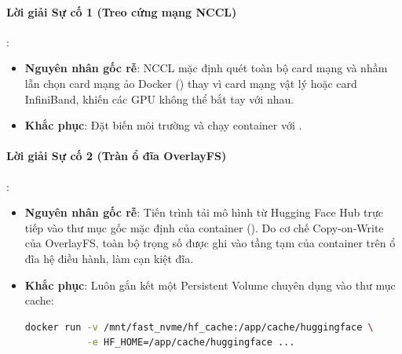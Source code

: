 \paragraph{Lời giải Sự cố 1 (Treo cứng mạng NCCL)}:
\begin{itemize}
  \item \textbf{Nguyên nhân gốc rễ}: NCCL mặc định quét toàn bộ card mạng và nhầm lẫn chọn card mạng ảo Docker () thay vì card mạng vật lý hoặc card InfiniBand, khiến các GPU không thể bắt tay với nhau.
  \item \textbf{Khắc phục}: Đặt biến môi trường  và chạy container với .
\end{itemize}

\paragraph{Lời giải Sự cố 2 (Tràn ổ đĩa OverlayFS)}:
\begin{itemize}
  \item \textbf{Nguyên nhân gốc rễ}: Tiến trình tải mô hình từ Hugging Face Hub trực tiếp vào thư mục gốc mặc định của container (). Do cơ chế Copy-on-Write của OverlayFS, toàn bộ trọng số được ghi vào tầng tạm  của container trên ổ đĩa hệ điều hành, làm cạn kiệt đĩa.
  \item \textbf{Khắc phục}: Luôn gắn kết một Persistent Volume chuyên dụng vào thư mục cache:
  \begin{lstlisting}[language=bash]
docker run -v /mnt/fast_nvme/hf_cache:/app/cache/huggingface \
           -e HF_HOME=/app/cache/huggingface ...
  \end{lstlisting}
\end{itemize}
